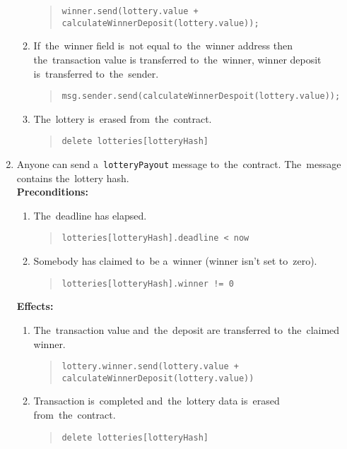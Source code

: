 \documentclass[a4paper]{article}
\begin{document}
\begin{enumerate}
\begin{enumerate}
              \begin{quote}
		\verb|winner.send(lottery.value + calculateWinnerDeposit(lottery.value));|
	      \end{quote}
	    \item If~the~winner field is~not equal to~the~winner address then the~transaction value is
	      transferred to~the~winner, winner deposit is~transferred to~the~sender.
	      \begin{quote}
		\verb|msg.sender.send(calculateWinnerDespoit(lottery.value));|
              \end{quote}
            \item The~lottery is~erased from~the~contract.
              \begin{quote}
                \verb|delete lotteries[lotteryHash]|
              \end{quote}
            \end{enumerate}
          \item Anyone can send a~\texttt{lotteryPayout} message to~the~contract. The~message contains the~lottery hash.\\
            \textbf{Preconditions:}
            \begin{enumerate}
            \item The~deadline has elapsed.
              \begin{quote}
		\verb|lotteries[lotteryHash].deadline < now|
              \end{quote}
            \item Somebody has claimed to~be a~winner (winner isn't set to~zero).
              \begin{quote}
                \verb|lotteries[lotteryHash].winner != 0|
              \end{quote}
            \end{enumerate}
            \textbf{Effects:}
            \begin{enumerate}
            \item The~transaction value and~the~deposit are transferred to~the~claimed winner.
              \begin{quote}
		\verb|lottery.winner.send(lottery.value + calculateWinnerDeposit(lottery.value))|
	      \end{quote}
            \item Transaction is~completed and~the~lottery data is~erased from~the~contract.
              \begin{quote}
                \verb|delete lotteries[lotteryHash]|
              \end{quote}
            \end{enumerate}
    \end{enumerate}
\end{document}
